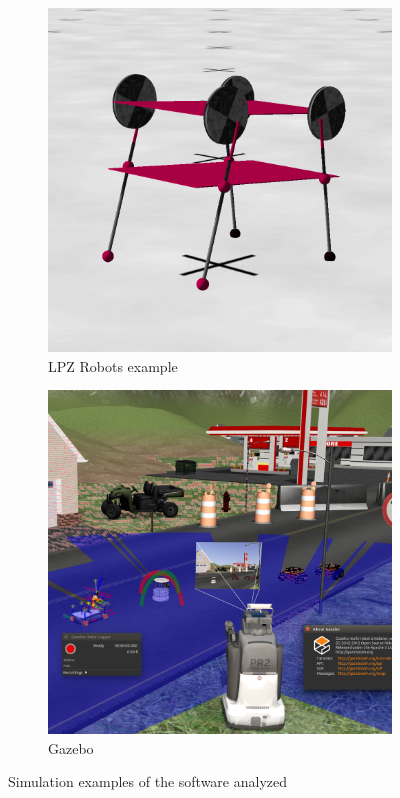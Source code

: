 \begin{figure}[hb!]
\begin{subfigure}{.33\textwidth}
    \includegraphics[width=.95\linewidth]{figures/lpzrobots_example}
    \caption{LPZ Robots example}
    \label{fig:lpzrobots_example}
  \end{subfigure}
  \begin{subfigure}{.33\textwidth}
    \centering
    \includegraphics[width=.95\linewidth]{figures/gazebo_example}
    \caption{Gazebo}
    \label{fig:gazebo_example}
  \end{subfigure}
  \caption{Simulation examples of the software analyzed}
  \label{fig:simulation_comparison}
\end{figure}

